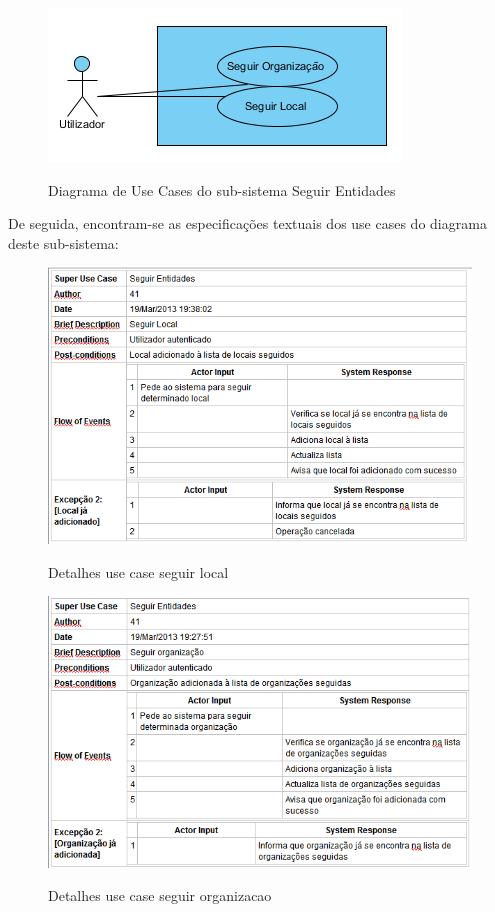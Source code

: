 ﻿\documentclass[12pt,a4paper]{article}
\begin{document}
\begin{figure}[h!]
\centering
\includegraphics[scale=1]{usecase/U_SeguirEntidades}
\label{usecase}
\caption{Diagrama de Use Cases do sub-sistema Seguir Entidades}
\end{figure}

De seguida, encontram-se as especificações textuais dos use cases do diagrama deste sub-sistema:\\


\begin{figure}[h!]
\centering
\includegraphics[scale=0.7]{d_usecase/seguirlocal}
\label{usecase}
\caption{Detalhes use case seguir local}
\end{figure}

\begin{figure}[h!]
\centering
\includegraphics[scale=0.7]{d_usecase/seguirorganizacao}
\label{usecase}
\caption{Detalhes use case seguir organizacao}
\end{figure}
\end{document}
